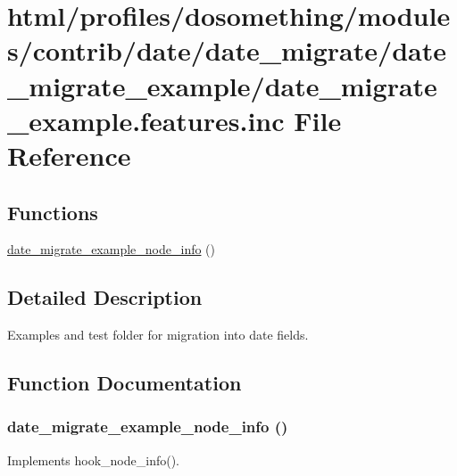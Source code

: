 \hypertarget{date__migrate__example_8features_8inc}{
\section{html/profiles/dosomething/modules/contrib/date/date\_\-migrate/date\_\-migrate\_\-example/date\_\-migrate\_\-example.features.inc File Reference}
\label{date__migrate__example_8features_8inc}
}
\subsection*{Functions}
\begin{DoxyCompactItemize}
\item 
\hyperlink{date__migrate__example_8features_8inc_a5278c32f9e1c00148820637a12202bd5}{date\_\-migrate\_\-example\_\-node\_\-info} ()
\end{DoxyCompactItemize}


\subsection{Detailed Description}
Examples and test folder for migration into date fields. 

\subsection{Function Documentation}
\hypertarget{date__migrate__example_8features_8inc_a5278c32f9e1c00148820637a12202bd5}{
\subsubsection[{date\_\-migrate\_\-example\_\-node\_\-info}]{\setlength{\rightskip}{0pt plus 5cm}date\_\-migrate\_\-example\_\-node\_\-info ()}}
\label{date__migrate__example_8features_8inc_a5278c32f9e1c00148820637a12202bd5}
Implements hook\_\-node\_\-info(). 